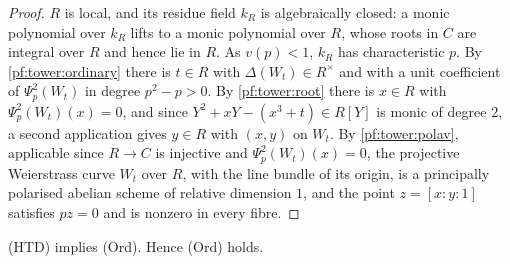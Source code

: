 \begin{proof}
$R$ is local, and its residue field $k_R$ is algebraically closed: a monic polynomial over $k_R$ lifts to a monic
polynomial over $R$, whose roots in $C$ are integral over $R$ and hence lie in $R$. As $v(p)<1$, $k_R$ has
characteristic $p$. By \cref{pf:tower:ordinary} there is $t\in R$ with $\Delta(W_t)\in R^\times$ and with a unit
coefficient of $\Psi_p^2(W_t)$ in degree $p^2-p>0$. By \cref{pf:tower:root} there is $x\in R$ with
$\Psi_p^2(W_t)(x)=0$, and since $Y^2+xY-(x^3+t)\in R[Y]$ is monic of degree $2$, a second application gives $y\in R$
with $(x,y)$ on $W_t$. By \cref{pf:tower:polav}, applicable since $R\to C$ is injective and $\Psi_p^2(W_t)(x)=0$, the
projective Weierstrass curve $W_t$ over $R$, with the line bundle of its origin, is a principally polarised abelian scheme
of relative dimension $1$, and the point $z=[x:y:1]$ satisfies $pz=0$ and is nonzero in every fibre.
\end{proof}

\begin{theorem}\label{pf:tower:ord}
\textup{(HTD)} implies \textup{(Ord)}. Hence \textup{(Ord)} holds.
\end{theorem}

